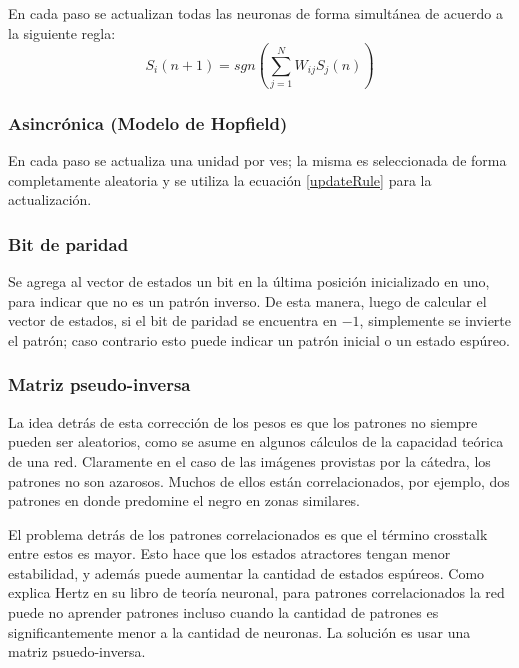 \documentclass[%
    final,
    reprint,
    notitlepage,
    narroweqnarray,
    inline,
    twoside,
    invited
    ]{ieee}
\begin{document}
\par En cada paso se actualizan todas las neuronas de forma simultánea de acuerdo a la siguiente regla:\\

\begin{equation}
\label{updateRule}
S_i(n+1) = sgn\left(\sum_{j=1}^{N}{W_{ij}S_j(n)}\right)
\end{equation}

\subsubsection{Asincrónica (Modelo de Hopfield)}

\par En cada paso se actualiza una unidad por ves; la misma es seleccionada de forma completamente aleatoria y se utiliza la ecuación \ref{updateRule} para la actualización.

\subsubsection{Bit de paridad}

\par Se agrega al vector de estados un bit en la última posición inicializado en uno, para indicar que no es un patrón inverso. De esta manera, luego de calcular el vector de estados, si el bit de paridad se encuentra en $-1$, simplemente se invierte el patrón; caso contrario esto puede indicar un patrón inicial o un estado espúreo.

\subsubsection{Matriz pseudo-inversa}

\par La idea detrás de esta corrección de los pesos es que los patrones no siempre pueden ser 
aleatorios, como se asume en algunos cálculos de la capacidad teórica de una red. Claramente 
en el caso de las imágenes provistas por la cátedra, los patrones no son azarosos. Muchos de ellos 
están correlacionados, por ejemplo, dos patrones en donde predomine el negro en zonas similares. 
\par El problema detrás de los patrones correlacionados es que el término crosstalk entre estos 
es mayor. Esto hace que los estados atractores tengan menor estabilidad, y además puede aumentar 
la cantidad de estados espúreos. Como explica Hertz en su libro de teoría neuronal, para patrones 
correlacionados la red puede no aprender patrones incluso cuando la cantidad de patrones 
es significantemente menor a la cantidad de neuronas. La solución es usar una 
matriz psuedo-inversa.
\end{document}
